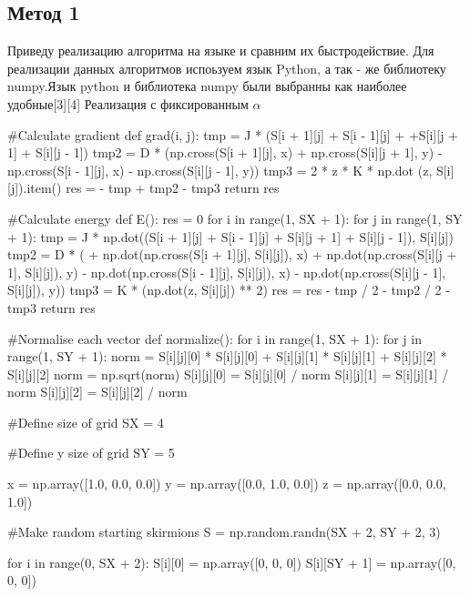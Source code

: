 \documentclass[ 12pt,x11names]{article}
\begin{document}
    \subsection{Метод 1}
    Приведу реализацию алгоритма на языке и сравним их быстродействие.
    Для реализации данных алгоритмов испоьзуем язык Python, а так - же библиотеку numpy.Язык python и библиотека numpy  были выбранны как наиболее удобные[3][4]
    Реализация с фиксированным $\alpha$\\
\begin{python}
    #Calculate gradient
    def grad(i, j):
        tmp = J * (S[i + 1][j] + S[i - 1][j] +
        +S[i][j + 1] + S[i][j - 1])
        tmp2 = D * (np.cross(S[i + 1][j], x)
        + np.cross(S[i][j + 1], y)
        - np.cross(S[i - 1][j], x)
        - np.cross(S[i][j - 1], y))
        tmp3 = 2 * z * K * np.dot  (z, S[i][j]).item()
        res = - tmp + tmp2 - tmp3
        return res

    #Calculate energy
    def E():
        res = 0
        for i in range(1, SX + 1):
            for j in range(1, SY + 1):
                tmp = J * np.dot((S[i + 1][j] + S[i - 1][j] +
                S[i][j + 1] + S[i][j - 1]), S[i][j])
                tmp2 = D * (
                + np.dot(np.cross(S[i + 1][j], S[i][j]), x)
                + np.dot(np.cross(S[i][j + 1], S[i][j]), y)
                - np.dot(np.cross(S[i - 1][j], S[i][j]), x)
                - np.dot(np.cross(S[i][j - 1], S[i][j]), y))
                tmp3 = K * (np.dot(z, S[i][j]) ** 2)
                res = res - tmp / 2 - tmp2 / 2 - tmp3
        return res

    #Normalise each vector
    def normalize():
    for i in range(1, SX + 1):
        for j in range(1, SY + 1):
            norm = S[i][j][0] * S[i][j][0] +
                   S[i][j][1] * S[i][j][1] +
                   S[i][j][2] * S[i][j][2]
            norm = np.sqrt(norm)
            S[i][j][0] = S[i][j][0] / norm
            S[i][j][1] = S[i][j][1] / norm
            S[i][j][2] = S[i][j][2] / norm


    #Define size of grid
    SX = 4

    #Define y size of grid
    SY = 5

    x = np.array([1.0, 0.0, 0.0])
    y = np.array([0.0, 1.0, 0.0])
    z = np.array([0.0, 0.0, 1.0])

    #Make random starting skirmions
    S = np.random.randn(SX + 2, SY + 2, 3)

    for i in range(0, SX + 2):
        S[i][0] = np.array([0, 0, 0])
        S[i][SY + 1] = np.array([0, 0, 0])


\end{python}
\end{document}
